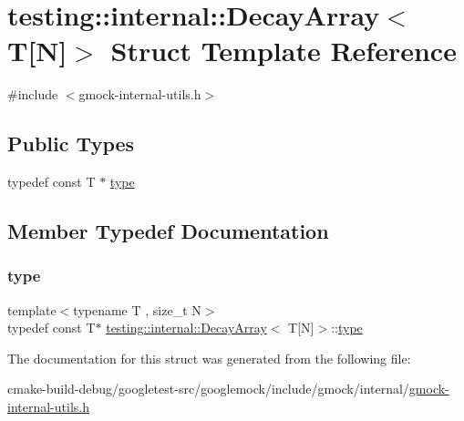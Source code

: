 \hypertarget{structtesting_1_1internal_1_1DecayArray_3_01T[N]_4}{}\section{testing\+::internal\+::Decay\+Array$<$ T\mbox{[}N\mbox{]}$>$ Struct Template Reference}
\label{structtesting_1_1internal_1_1DecayArray_3_01T[N]_4}


{\ttfamily \#include $<$gmock-\/internal-\/utils.\+h$>$}

\subsection*{Public Types}
\begin{DoxyCompactItemize}
\item 
typedef const T $\ast$ \mbox{\hyperlink{structtesting_1_1internal_1_1DecayArray_3_01T[N]_4_afc22a88da484b94639501c07fb90bfd3}{type}}
\end{DoxyCompactItemize}


\subsection{Member Typedef Documentation}
\mbox{\label{structtesting_1_1internal_1_1DecayArray_3_01T[N]_4_afc22a88da484b94639501c07fb90bfd3}} 
\subsubsection{\texorpdfstring{type}{type}}
{\footnotesize\ttfamily template$<$typename T , size\+\_\+t N$>$ \\
typedef const T$\ast$ \mbox{\hyperlink{structtesting_1_1internal_1_1DecayArray}{testing\+::internal\+::\+Decay\+Array}}$<$ T\mbox{[}N\mbox{]}$>$\+::\mbox{\hyperlink{structtesting_1_1internal_1_1DecayArray_3_01T[N]_4_afc22a88da484b94639501c07fb90bfd3}{type}}}



The documentation for this struct was generated from the following file\+:\begin{DoxyCompactItemize}
\item 
cmake-\/build-\/debug/googletest-\/src/googlemock/include/gmock/internal/\mbox{\hyperlink{gmock-internal-utils_8h}{gmock-\/internal-\/utils.\+h}}\end{DoxyCompactItemize}
